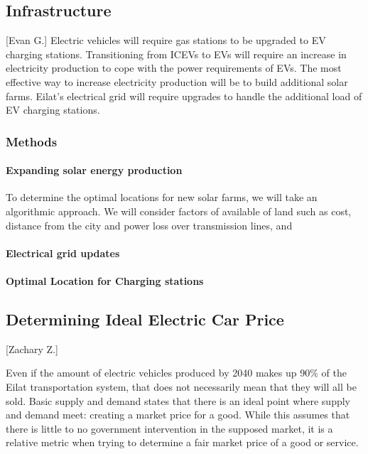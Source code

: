 \documentclass{article}                         %
\begin{document}
\subsection{Infrastructure}[Evan G.]
Electric vehicles will require gas stations to be upgraded to EV charging stations. Transitioning from ICEVs to EVs will require an increase in electricity production to cope with the power requirements of EVs. The most effective way to increase electricity production will be to build additional solar farms. Eilat's electrical grid will require upgrades to handle the additional load of EV charging stations. 
\subsubsection{Methods}
\paragraph{Expanding solar energy production}
To determine the optimal locations for new solar farms, we will take an algorithmic approach. We will consider factors of available of land such as cost, distance from the city and power loss over transmission lines, and 


\paragraph{Electrical grid updates}


\paragraph{Optimal Location for Charging stations}


\subsection{Determining Ideal Electric Car Price}[Zachary Z.]

Even if the amount of electric vehicles produced by 2040 makes up 90\% of the Eilat transportation system, that does not necessarily mean that they will all be sold. Basic supply and demand states that there is an ideal point where supply and demand meet: creating a market price for a good. While this assumes that there is little to no government intervention in the supposed market, it is a relative metric when trying to determine a fair market price of a good or service. 
\end{document}
